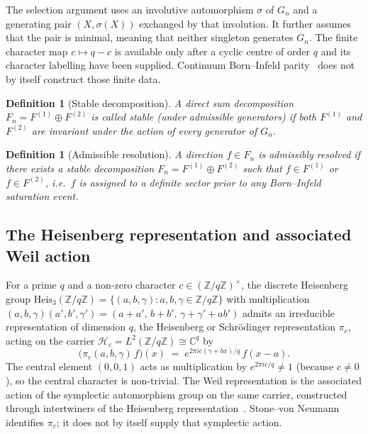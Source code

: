 \documentclass[11pt,a4paper]{article}
\newtheorem{definition}[theorem]{Definition}
\begin{document}
    The selection argument uses an involutive automorphism $\sigma$ of $G_n$ and
    a generating pair $(X,\sigma(X))$ exchanged by that involution.
    It further assumes that the pair is minimal, meaning that neither singleton
    generates $G_n$.
    The finite character map $c\mapsto q-c$ is available only after a cyclic
    centre of order $q$ and its character labelling have been supplied.
    Continuum Born--Infeld parity~\cite{BornInfeld} does not by itself construct
    those finite data.

    \begin{definition}[Stable decomposition]
      \label{def:stable}
      A direct sum decomposition $F_n = F^{(1)} \oplus F^{(2)}$ is called
      \emph{stable} (under admissible generators) if both $F^{(1)}$ and $F^{(2)}$
      are invariant under the action of every generator of $G_n$.
    \end{definition}

    \begin{definition}[Admissible resolution]
      \label{def:resolution}
      A direction $f \in F_n$ is \emph{admissibly resolved} if there exists a
      stable decomposition $F_n = F^{(1)} \oplus F^{(2)}$ such that
      $f \in F^{(1)}$ or $f \in F^{(2)}$, i.e.\ $f$ is assigned to a definite
      sector prior to any Born--Infeld saturation event.
    \end{definition}

  \subsection{The Heisenberg representation and associated Weil action}

    For a prime $q$ and a non-zero character $c \in (\mathbb{Z}/q\mathbb{Z})^\times$,
    the discrete Heisenberg group
    $\mathrm{Heis}_3(\mathbb{Z}/q\mathbb{Z}) = \{(a,b,\gamma) : a,b,\gamma \in \mathbb{Z}/q\mathbb{Z}\}$
    with multiplication
    $(a,b,\gamma)(a',b',\gamma') = (a+a',\, b+b',\, \gamma+\gamma'+ab')$
    admits an irreducible representation of dimension $q$, the Heisenberg or
    Schr\"odinger representation $\pi_c$, acting on the carrier
    $\mathcal{H}_c=L^2(\mathbb{Z}/q\mathbb{Z})\cong\mathbb{C}^q$ by
    \begin{equation}
      \bigl(\pi_c(a,b,\gamma)\,f\bigr)(x)
      \;=\; e^{2\pi i c(\gamma + bx)/q}\,f(x - a).
      \label{eq:heisenberg-representation}
    \end{equation}
    The central element $(0,0,1)$ acts as multiplication by $e^{2\pi ic/q} \neq 1$
    (because $c \neq 0$), so the central character is non-trivial.
    The Weil representation is the associated action of the symplectic
    automorphism group on the same carrier, constructed through intertwiners of
    the Heisenberg representation~\cite{GurevichHadani2009}.
    Stone--von Neumann identifies $\pi_c$; it does not by itself supply that
    symplectic action.
\end{document}
